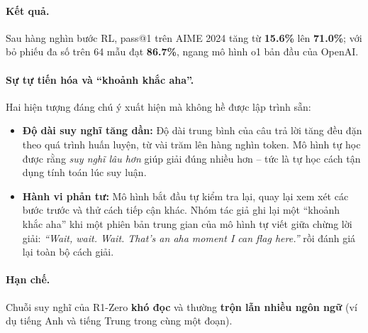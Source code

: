 \paragraph{Kết quả.} Sau hàng nghìn bước RL, pass@1 trên AIME 2024 tăng từ \textbf{15.6\%} lên \textbf{71.0\%}; với bỏ phiếu đa số trên 64 mẫu đạt \textbf{86.7\%}, ngang mô hình o1 bản đầu của OpenAI.

\paragraph{Sự tự tiến hóa và “khoảnh khắc aha”.} Hai hiện tượng đáng chú ý xuất hiện mà không hề được lập trình sẵn:
\begin{itemize}
	\item \textbf{Độ dài suy nghĩ tăng dần:} Độ dài trung bình của câu trả lời tăng đều đặn theo quá trình huấn luyện, từ vài trăm lên hàng nghìn token. Mô hình tự học được rằng \emph{suy nghĩ lâu hơn} giúp giải đúng nhiều hơn -- tức là tự học cách tận dụng tính toán lúc suy luận.
	\item \textbf{Hành vi phản tư:} Mô hình bắt đầu tự kiểm tra lại, quay lại xem xét các bước trước và thử cách tiếp cận khác. Nhóm tác giả ghi lại một “khoảnh khắc aha” khi một phiên bản trung gian của mô hình tự viết giữa chừng lời giải: \emph{“Wait, wait. Wait. That's an aha moment I can flag here.”} rồi đánh giá lại toàn bộ cách giải.
\end{itemize}

\begin{center}
\label{fig:r1_zero_length}
\end{center}

\paragraph{Hạn chế.} Chuỗi suy nghĩ của R1-Zero \textbf{khó đọc} và thường \textbf{trộn lẫn nhiều ngôn ngữ} (ví dụ tiếng Anh và tiếng Trung trong cùng một đoạn).

